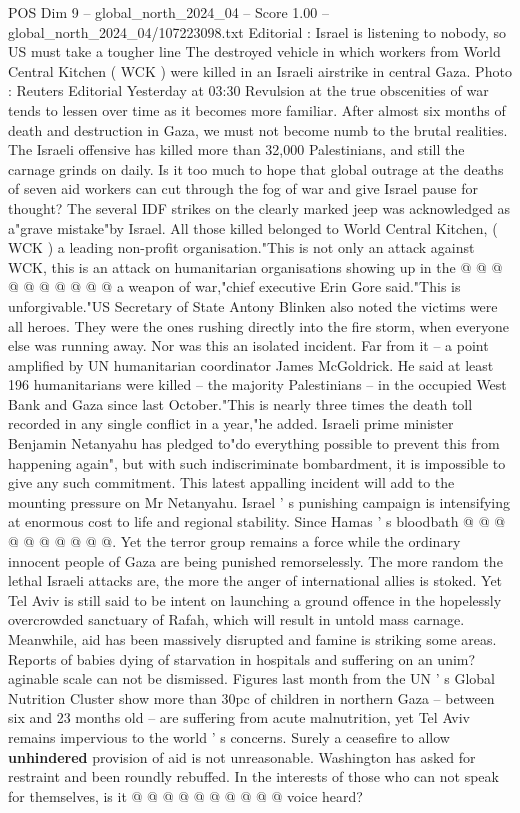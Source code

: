 \begin{textsample}{POS Dim 9 – global\_north\_2024\_04 – Score 1.00 – global\_north\_2024\_04/107223098.txt}  \label{ex:f9_pos_237}
Editorial : Israel is listening to nobody, so US must take a tougher line The destroyed vehicle in which workers from World Central Kitchen ( WCK ) were killed in an Israeli airstrike in central Gaza.
Photo : Reuters Editorial Yesterday at 03:30 Revulsion at the true obscenities of war tends to lessen over time as it becomes more familiar.
After almost six months of death and destruction in Gaza, we must not become numb to the brutal realities.
The Israeli offensive has killed more than 32,000 Palestinians, and still the carnage grinds on daily.
Is it too much to hope that global outrage at the deaths of seven aid workers can cut through the fog of war and give Israel pause for thought?
The several IDF strikes on the clearly marked jeep was acknowledged as a"grave mistake"by Israel.
All those killed belonged to World Central Kitchen, ( WCK ) a leading non-profit organisation."This is not only an attack against WCK, this is an attack on humanitarian organisations showing up in the @ @ @ @ @ @ @ @ @ @ a weapon of war,"chief executive Erin Gore said."This is unforgivable."US Secretary of State Antony Blinken also noted the victims were all heroes.
They were the ones rushing directly into the fire storm, when everyone else was running away.
Nor was this an isolated incident.
Far from it -- a point amplified by UN humanitarian coordinator James McGoldrick.
He said at least 196 humanitarians were killed -- the majority Palestinians -- in the occupied West Bank and Gaza since last October."This is nearly three times the death toll recorded in any single conflict in a year,"he added.
Israeli prime minister Benjamin Netanyahu has pledged to"do everything possible to prevent this from happening again", but with such indiscriminate bombardment, it is impossible to give any such commitment.
This latest appalling incident will add to the mounting pressure on Mr Netanyahu.
Israel ' s punishing campaign is intensifying at enormous cost to life and regional stability.
Since Hamas ' s bloodbath @ @ @ @ @ @ @ @ @ @.
Yet the terror group remains a force while the ordinary innocent people of Gaza are being punished remorselessly.
The more random the lethal Israeli attacks are, the more the anger of international allies is stoked.
Yet Tel Aviv is still said to be intent on launching a ground offence in the hopelessly overcrowded sanctuary of Rafah, which will result in untold mass carnage.
Meanwhile, aid has been massively disrupted and famine is striking some areas.
Reports of babies dying of starvation in hospitals and suffering on an unim? aginable scale can not be dismissed.
Figures last month from the UN ' s Global Nutrition Cluster show more than 30pc of children in northern Gaza -- between six and 23 months old -- are suffering from acute malnutrition, yet Tel Aviv remains impervious to the world ' s concerns.
Surely a ceasefire to allow \textbf{unhindered} provision of aid is not unreasonable.
Washington has asked for restraint and been roundly rebuffed.
In the interests of those who can not speak for themselves, is it @ @ @ @ @ @ @ @ @ @ voice heard?

\end{textsample}
